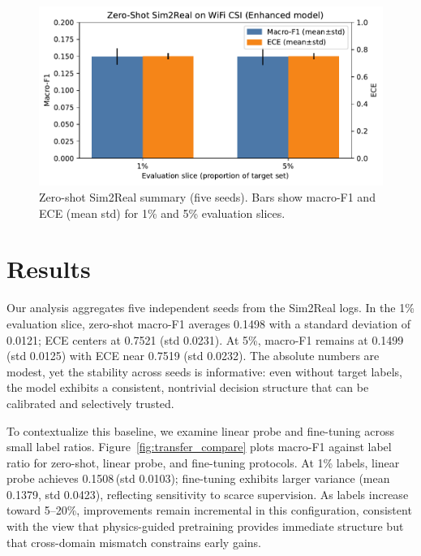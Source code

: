\documentclass[journal]{IEEEtran}
\begin{document}
\begin{figure}[t]
\centering
\includegraphics[width=\columnwidth]{plots/zero_shot_summary.pdf}
\caption{Zero-shot Sim2Real summary (five seeds). Bars show macro-F1 and ECE (mean\,\textpm\,std) for 1\% and 5\% evaluation slices.}
\label{fig:zs_summary}
\end{figure}

\section{Results}
Our analysis aggregates five independent seeds from the Sim2Real logs. In the 1\% evaluation slice, zero-shot macro-F1 averages 0.1498 with a standard deviation of 0.0121; ECE centers at 0.7521 (std 0.0231). At 5\%, macro-F1 remains at 0.1499 (std 0.0125) with ECE near 0.7519 (std 0.0232). The absolute numbers are modest, yet the stability across seeds is informative: even without target labels, the model exhibits a consistent, nontrivial decision structure that can be calibrated and selectively trusted.

To contextualize this baseline, we examine linear probe and fine-tuning across small label ratios. Figure~\ref{fig:transfer_compare} plots macro-F1 against label ratio for zero-shot, linear probe, and fine-tuning protocols. At 1\% labels, linear probe achieves 0.1508\,(std 0.0103); fine-tuning exhibits larger variance (mean 0.1379, std 0.0423), reflecting sensitivity to scarce supervision. As labels increase toward 5–20\%, improvements remain incremental in this configuration, consistent with the view that physics-guided pretraining provides immediate structure but that cross-domain mismatch constrains early gains.
\end{document}
